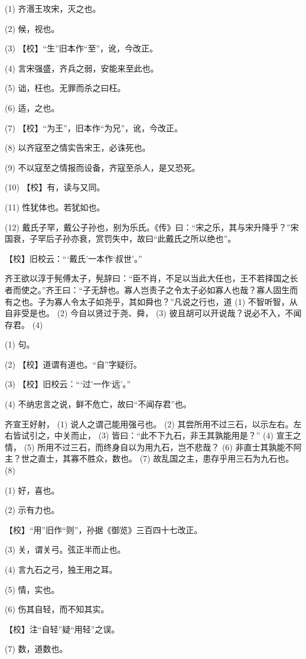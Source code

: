 \documentclass[12pt,UTF8]{ctexbook}
\begin{document}
(1) 齐湣王攻宋，灭之也。

(2) 候，视也。

(3) 【校】“生”旧本作“至”，讹，今改正。

(4) 言宋强盛，齐兵之弱，安能来至此也。

(5) 诎，枉也。无罪而杀之曰枉。

(6) 适，之也。

(7) 【校】“为王”，旧本作“为兄”，讹，今改正。

(8) 以齐寇至之情实告宋王，必诛死也。

(9) 不以寇至之情报而设备，齐寇至杀人，是又恐死。

(10) 【校】有，读与又同。

(11) 性犹体也。若犹如也。

(12) 戴氏子罕，戴公子孙也，别为乐氏。《传》曰：“宋之乐，其与宋升降乎？”宋国衰，子罕后子孙亦衰，赏罚失中，故曰“此戴氏之所以绝也”。

【校】旧校云：“‘戴氏’一本作‘叔世’。”

齐王欲以淳于髡傅太子，髡辞曰：“臣不肖，不足以当此大任也，王不若择国之长者而使之。”齐王曰：“子无辞也。寡人岂责子之令太子必如寡人也哉？寡人固生而有之也。子为寡人令太子如尧乎，其如舜也？”凡说之行也，道 (1) 不智听智，从自非受是也。 (2) 今自以贤过于尧、舜， (3) 彼且胡可以开说哉？说必不入，不闻存君。 (4)

(1) 句。

(2) 【校】道谓有道也。“自”字疑衍。

(3) 【校】旧校云：“‘过’一作‘远’。”

(4) 不纳忠言之说，鲜不危亡，故曰“不闻存君”也。

齐宣王好射， (1) 说人之谓己能用强弓也。 (2) 其尝所用不过三石，以示左右。左右皆试引之，中关而止， (3) 皆曰：“此不下九石，非王其孰能用是？” (4) 宣王之情， (5) 所用不过三石，而终身自以为用九石，岂不悲哉？ (6) 非直士其孰能不阿主？世之直士，其寡不胜众，数也。 (7) 故乱国之主，患存乎用三石为九石也。 (8)

(1) 好，喜也。

(2) 示有力也。

【校】“用”旧作“则”，孙据《御览》三百四十七改正。

(3) 关，谓关弓。弦正半而止也。

(4) 言九石之弓，独王用之耳。

(5) 情，实也。

(6) 伤其自轻，而不知其实。

【校】注“自轻”疑“用轻”之误。

(7) 数，道数也。
\end{document}
